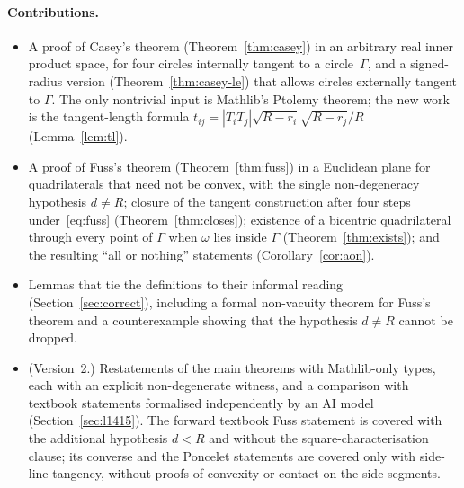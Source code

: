 \documentclass[11pt]{article}
\theoremstyle{definition}
\theoremstyle{remark}
\begin{document}
\paragraph{Contributions.}
\begin{itemize}
\item A proof of Casey's theorem (Theorem~\ref{thm:casey}) in an arbitrary real inner product
space, for four circles internally tangent to a circle~$\Gamma$, and a signed-radius version
(Theorem~\ref{thm:casey-le}) that allows circles externally tangent to $\Gamma$. The only
nontrivial input is Mathlib's Ptolemy theorem; the new work is the tangent-length formula
$t_{ij}=|T_iT_j|\sqrt{R-r_i}\sqrt{R-r_j}/R$ (Lemma~\ref{lem:tl}).
\item A proof of Fuss's theorem (Theorem~\ref{thm:fuss}) in a Euclidean plane for quadrilaterals
that need not be convex, with the single non-degeneracy hypothesis $d\ne R$; closure of the tangent
construction after four steps under~\eqref{eq:fuss} (Theorem~\ref{thm:closes}); existence of a
bicentric quadrilateral through every point of $\Gamma$ when $\omega$ lies inside $\Gamma$
(Theorem~\ref{thm:exists}); and the resulting ``all or nothing'' statements
(Corollary~\ref{cor:aon}).
\item Lemmas that tie the definitions to their informal reading (Section~\ref{sec:correct}),
including a formal non-vacuity theorem for Fuss's theorem and a
counterexample showing that the hypothesis $d\ne R$ cannot be dropped.
\item (Version~2.) Restatements of the main theorems with Mathlib-only types, each with an explicit
non-degenerate witness, and a comparison with textbook statements formalised independently by an AI
model (Section~\ref{sec:l1415}). The forward textbook Fuss statement is covered with the additional
hypothesis $d<R$ and without the square-characterisation clause; its converse and the Poncelet statements
are covered only with side-line tangency, without proofs of convexity or contact on the side segments.
\end{itemize}
\end{document}
